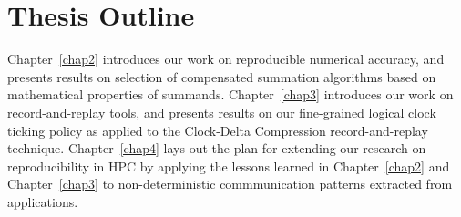 \section{Thesis Outline}
Chapter~\ref{chap2} introduces our work on reproducible numerical
accuracy, and presents results on selection of compensated summation
algorithms based on mathematical properties of summands. Chapter~\ref{chap3}
introduces our work on record-and-replay tools, and presents results 
on our fine-grained logical clock ticking policy as applied to the
Clock-Delta Compression record-and-replay technique. Chapter~\ref{chap4}
lays out the plan for extending our research on reproducibility in HPC
by applying the lessons learned in Chapter~\ref{chap2} and Chapter~\ref{chap3}
to non-deterministic commmunication patterns extracted from applications. 
 
